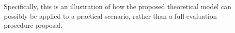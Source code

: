 Specifically, this is an illustration of how the proposed theoretical model can possibly be applied to a practical scenario, rather than a full evaluation procedure proposal.


%

